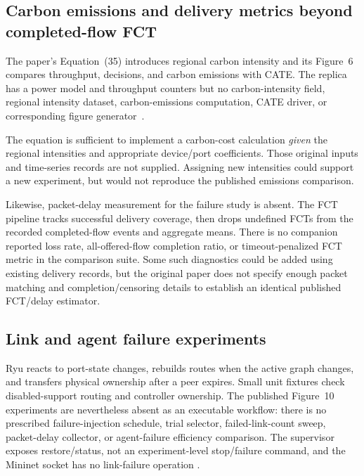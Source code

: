 \documentclass[11pt,a4paper]{article}
\begin{document}
\subsection{Carbon emissions and delivery metrics beyond completed-flow FCT}

The paper's Equation~(35) introduces regional carbon intensity and its
Figure~6 compares throughput, decisions, and carbon emissions with CATE.
The replica has a power model and throughput counters but no carbon-intensity
field, regional intensity dataset, carbon-emissions computation, CATE driver,
or corresponding figure generator~\cite{paper,code-reward,code-plots}.

The equation is sufficient to implement a carbon-cost calculation \emph{given}
the regional intensities and appropriate device/port coefficients. Those
original inputs and time-series records are not supplied. Assigning new
intensities could support a new experiment, but would not reproduce the
published emissions comparison.

Likewise, packet-delay measurement for the failure study is absent. The FCT
pipeline tracks successful delivery coverage, then drops undefined FCTs from
the recorded completed-flow events and aggregate means. There is no companion
reported loss rate, all-offered-flow completion ratio, or timeout-penalized FCT
metric in the comparison suite. Some such diagnostics could be added using
existing delivery records, but the original paper does not specify enough
packet matching and completion/censoring details to establish an identical
published FCT/delay estimator.

\subsection{Link and agent failure experiments}

Ryu reacts to port-state changes, rebuilds routes when the active graph
changes, and transfers physical ownership after a peer expires. Small unit
fixtures check disabled-support routing and controller ownership. The
published Figure~10 experiments are nevertheless absent as an executable
workflow: there is no prescribed failure-injection schedule, trial selector,
failed-link-count sweep, packet-delay collector, or agent-failure efficiency
comparison. The supervisor exposes restore/status, not an experiment-level
stop/failure command, and the Mininet socket has no link-failure operation
\cite{paper,code-runtime,code-routing,code-tests}.
\end{document}
